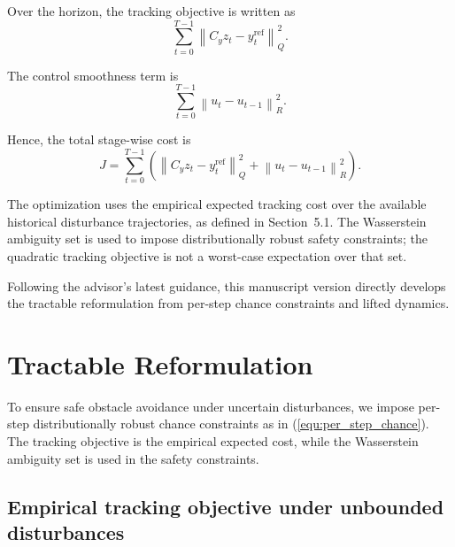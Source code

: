 \documentclass[pdflatex,sn-mathphys,Numbered]{sn-jnl}
\numberwithin{equation}{section}
\begin{document}
Over the horizon, the tracking objective is written as
\begin{equation}
\sum_{t=0}^{T-1} \left\| C_y z_t - y_t^{\text{ref}} \right\|_{Q}^2. \label{equ:tracking_error}
\end{equation}

The control smoothness term is
\begin{equation}
\sum_{t=0}^{T-1} \left\| u_t - u_{t-1} \right\|_{R}^2. \label{equ:smoothness_penalty}
\end{equation}

Hence, the total stage-wise cost is
\begin{equation}
J = \sum_{t=0}^{T-1}\!\left( \left\| C_y z_t - y_t^{\text{ref}} \right\|_{Q}^2 + \left\| u_t - u_{t-1} \right\|_{R}^2 \right). \label{equ:total_cost}
\end{equation}

The optimization uses the empirical expected tracking cost over the available historical disturbance trajectories, as defined in Section~5.1. The Wasserstein ambiguity set is used to impose distributionally robust safety constraints; the quadratic tracking objective is not a worst-case expectation over that set.

Following the advisor's latest guidance, this manuscript version directly develops the tractable reformulation from per-step chance constraints and lifted dynamics.


\section{Tractable Reformulation}

To ensure safe obstacle avoidance under uncertain disturbances, we impose per-step distributionally robust chance constraints as in (\ref{equ:per_step_chance}). The tracking objective is the empirical expected cost, while the Wasserstein ambiguity set is used in the safety constraints.

\subsection{Empirical tracking objective under unbounded disturbances}
\end{document}
